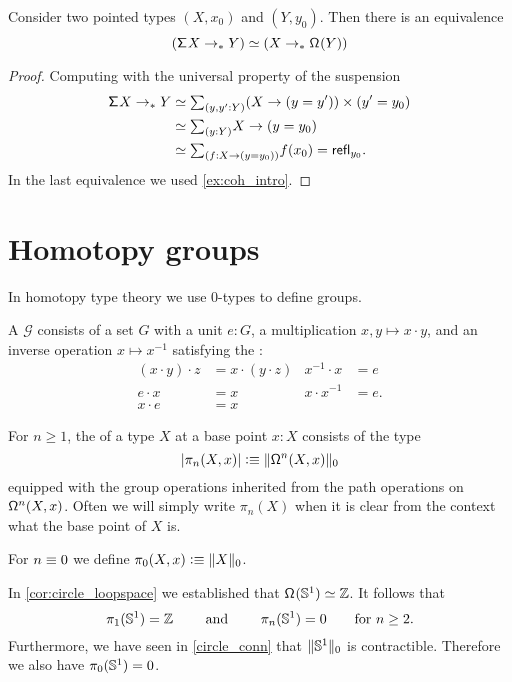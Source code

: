 \begin{thm}
Consider two pointed types $(X,x_0)$ and $(Y,y_0)$. Then there is an equivalence
\begin{equation*}
\eqv{(\susp X \to_\ast Y)}{(X \to_\ast \loopspace Y)}
\end{equation*}
\end{thm}

\begin{proof}
Computing with the universal property of the suspension
\begin{align*}
\susp X \to_\ast Y & \eqvsym \sm{y,y':Y} (X \to (y=y'))\times (y'=y_0) \\
& \eqvsym \sm{y:Y} X\to (y=y_0) \\
& \eqvsym \sm{f:X\to (y=y_0)}f(x_0)=\refl{y_0}.
\end{align*}
In the last equivalence we used \cref{ex:coh_intro}.
\end{proof}

\section{Homotopy groups}
In homotopy type theory we use $0$-types to define groups.
\begin{defn}
A  $\mathcal{G}$ consists of a set $G$ with a unit $e:G$, a multiplication $x,y\mapsto x\cdot y$, and an inverse operation $x\mapsto x^{-1}$ satisfying the :
\begin{align*}
(x\cdot y)\cdot z & =x\cdot(y\cdot z) & x^{-1}\cdot x & = e \\
e\cdot x & = x & x\cdot x^{-1} & = e. \\
x\cdot e & =x
\end{align*}
\end{defn}

\begin{defn}
For $n\geq 1$, the  of a type $X$ at a base point $x:X$ consists of the type
\begin{equation*}
|\pi_n(X,x)| \defeq \trunc{0}{\loopspace[n]{X,x}}
\end{equation*}
equipped with the group operations inherited from the path operations on $\loopspace[n]{X,x}$. 
Often we will simply write $\pi_n(X)$ when it is clear from the context what the base point of $X$ is.

For $n\jdeq 0$ we define $\pi_0(X,x)\defeq \trunc{0}{X}$. 
\end{defn}

\begin{eg}
In \cref{cor:circle_loopspace} we established that $\eqv{\loopspace{\sphere{1}}}{\Z}$. It follows that
\begin{equation*}
\pi_1(\sphere{1})=\Z \qquad\text{ and }\qquad\pi_n(\sphere{1})=0\qquad\text{for $n\geq 2$.}
\end{equation*}
Furthermore, we have seen in \cref{circle_conn} that $\trunc{0}{\sphere{1}}$ is contractible. 
Therefore we also have $\pi_0(\sphere{1})=0$.
\end{eg}


